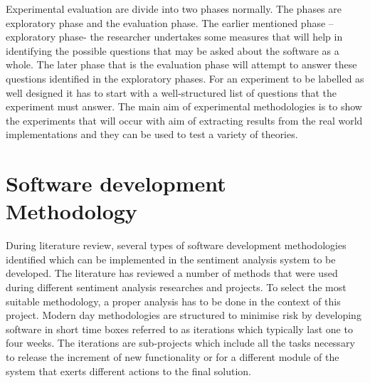 \documentclass[12pt]{report}
\begin{document}
	Experimental evaluation are divide into two phases normally. The phases are exploratory phase and the evaluation phase. The earlier mentioned phase –exploratory phase- the researcher undertakes some measures that will help in identifying the possible questions that may be asked about the software as a whole. The later phase that is the evaluation phase will attempt to answer these questions identified in the exploratory phases. For an experiment to be labelled as well designed it has to start with a well-structured list of questions that the experiment must answer. The main aim of experimental methodologies is to show the experiments that will occur with aim of extracting results from the real world implementations and they can be used to test a variety of theories.\\
	
	\section{Software development Methodology}
	During literature review, several types of software development methodologies identified which can be implemented in the sentiment analysis system to be developed. The literature has reviewed a number of methods that were used during different sentiment analysis researches and projects. To select the most suitable methodology, a proper analysis has to be done in the context of this project. Modern day methodologies are structured to minimise risk by developing software in short time boxes referred to as iterations which typically last one to four weeks. The iterations are sub-projects which include all the tasks necessary to release the increment of new functionality or for a different module of the system that exerts different actions to the final solution.\\
	
\end{document}
